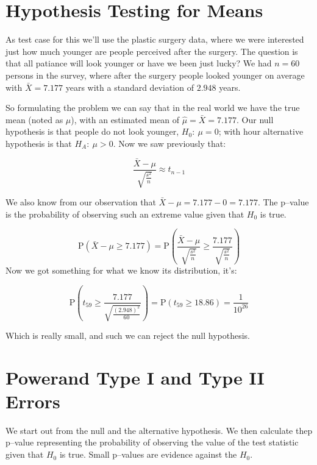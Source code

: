 \section{Hypothesis Testing for Means}

As test case for this we'll use the plastic surgery data, where we were
interested just how much younger are people perceived after the surgery. The
question is that all patiance will look younger or have we been just lucky? We
had $n=60$ persons in the survey, where after the surgery people looked younger
on average with $\bar{X}=7.177$ years with a standard deviation of $2.948$
years.

So formulating the problem we can say that in the real world we have the true
mean (noted as $\mu$), with an estimated mean of $\hat{\mu}=\bar{X}=7.177$. Our
null hypothesis is that people do not look younger, $H_0:~\mu=0$; with hour
alternative hypothesis is that $H_A:~\mu>0$. Now we saw previously that:

\[ \frac{\bar{X}-\mu}{\sqrt{\frac{s^2}{n}}}  \approx t_{n-1}
\]

We also know from our observation that $\bar{X}-\mu=7.177-0=7.177$. The p--value
is the probability of observing such an extreme value given that $H_0$ is true.

\[ \mbox{P} \left( \bar{X} - \mu \geq 7.177\right) = 
\mbox{P} \left( \frac{\bar{X}-\mu}{\sqrt{\frac{s^2}{n}}} \geq
\frac{7.177}{\sqrt{\frac{s^2}{n}}}  \right)
\]
Now we got something for what we know its distribution, it's:

\[ \mbox{P} \left( t_{59} \geq \frac{7.177}{\sqrt{\frac{(2.948)^2}{60}}}\right)
= \mbox{P} \left( t_{59} \geq 18.86 \right) = \frac{1}{10^{26}}
\]

Which is really small, and such we can reject the null hypothesis.

\section{Powerand Type I and Type II Errors}

We start out from the null and the alternative hypothesis. We then calculate
thep p--value representing the probability of observing the value of the test
statistic given that $H_0$ is true. Small p--values are evidence against the
$H_0$.

